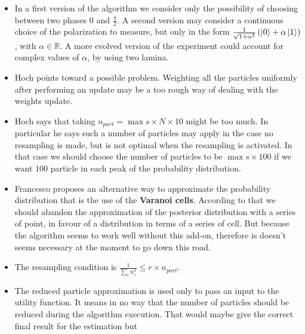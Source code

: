 \documentclass[aps, pra, 10pt, twocolumn, superscriptaddress,floatfix]{revtex4-1}
\begin{document}
\begin{itemize}
	\item In a first version of the algorithm we consider only the possibility of choosing between two phases $0$ and $\frac{\pi}{2}$. A second version may consider a continuous choice of the polarization to measure, but only in the form $\frac{1}{\sqrt{1+\alpha^2}} \left( \ket{0} + \alpha \ket{1} \right)$, with $\alpha \in \mathbb{R}$. A more evolved version of the experiment could account for complex values of $\alpha$, by using two lamina.
	 
	\item Hoch points toward a possible problem. Weighting all the particles uniformly after performing an update may be a too rough way of dealing with the weights update.
	
	\item Hoch says that taking $n_{part} =  \max{s} \times N \times 10$ might be too much. In particular he says such a number of particles may apply in the case no resampling is made, but is not optimal when the resampling is activated. In that case we should choose the number of particles to be $\max{s} \times 100$ if we want $100$ particle in each peak of the probability distribution.
	
	\item Francesco proposes an alternative way to approximate the probability distribution that is the use of the {\textbf{Varanoi cells}}. According to that we should abandon the approximation of the posterior distribution with a series of point, in favour of a distribution in terms of a series of cell. But because the algorithm seems to work well without this add-on, therefore is doesn't seems necessary at the moment to go down this road.
	
	\item The resampling condition is $\frac{1}{\sum_{i} w_i^2} \le r \times n_{part}$.
	
	\item The reduced particle approximation is used only to pass an input to the utility function. It means in no way that the number of particles should be reduced during the algorithm execution. That would maybe give the correct final result for the estimation but 
	

\end{itemize}
\end{document}
